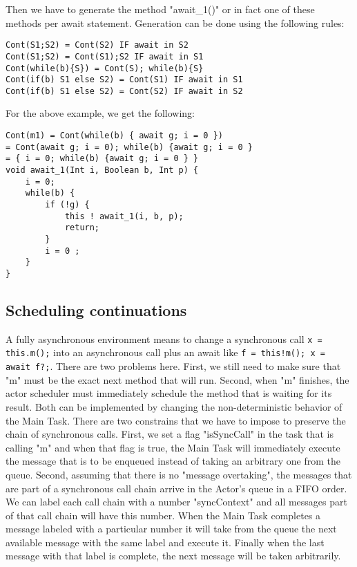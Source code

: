 Then we have to generate the method "await\_1()" or in fact one of these methods per await statement. Generation can be done using the following rules:


\begin{lstlisting}
Cont(S1;S2) = Cont(S2) IF await in S2
Cont(S1;S2) = Cont(S1);S2 IF await in S1
Cont(while(b){S}) = Cont(S); while(b){S}
Cont(if(b) S1 else S2) = Cont(S1) IF await in S1
Cont(if(b) S1 else S2) = Cont(S2) IF await in S2
\end{lstlisting}
For the above example, we get the following:

\begin{lstlisting}
Cont(m1) = Cont(while(b) { await g; i = 0 })
= Cont(await g; i = 0); while(b) {await g; i = 0 }
= { i = 0; while(b) {await g; i = 0 } }
void await_1(Int i, Boolean b, Int p) {
	i = 0; 
	while(b) {
		if (!g) {
			this ! await_1(i, b, p);
			return;
		}
		i = 0 ;
	}
}
\end{lstlisting}

\subsection{Scheduling continuations}
A fully asynchronous environment means to change a synchronous call \lstinline|x = this.m();| into an asynchronous call plus an await like \lstinline|f = this!m(); x = await f?;|. There are two problems here. First, we still need to make sure that "m" must be the exact next method that will run. Second, when "m" finishes, the actor scheduler must immediately schedule the method that is waiting for its result. Both can be implemented by changing the non-deterministic behavior of the Main Task. There are two constrains that we have to impose to preserve the chain of synchronous calls. First, we set a flag "isSyncCall" in the task that is calling "m" and when that flag is true, the Main Task will immediately execute the message that is to be enqueued instead of taking an arbitrary one from the queue. Second, assuming that there is no "message overtaking", the messages that are part of a synchronous call chain arrive in the Actor's queue in a FIFO order. We can label each call chain with a number "syncContext" and all messages part of that call chain will have this number. When the Main Task completes a message labeled with a particular number it will take from the queue the next available message with the same label and execute it. Finally when the last message with that label is complete, the next message will be taken arbitrarily.

